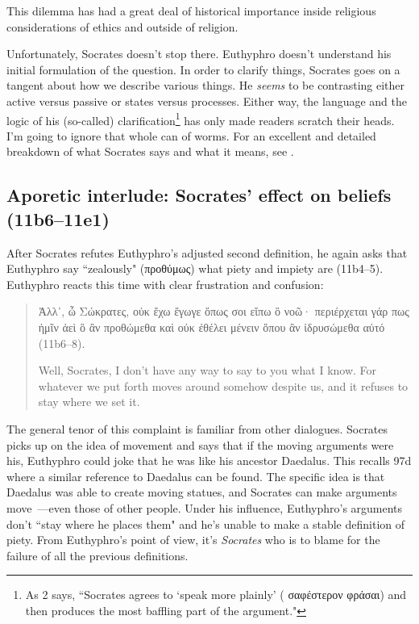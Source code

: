 \documentclass[12pt]{article}
\begin{document}
This dilemma has had a great deal of historical importance inside religious
considerations of ethics and outside of religion.

Unfortunately, Socrates doesn't stop there.  Euthyphro doesn't understand his
initial formulation of the question.  In order to clarify things, Socrates goes
on a tangent about how we describe various things.  He \emph{seems} to be
contrasting either active versus passive or states versus processes.  Either
way, the language and the logic of his (so-called) clarification\footnote{As
\cite{cohen1971} 2 says, ``Socrates agrees to `speak more plainly' ({\g
σαφέστερον φράσαι}) and then produces the most baffling part of the argument."}
has only made readers scratch their heads.  I'm going to ignore that whole can
of worms.  For an excellent and detailed breakdown of what Socrates says and
what it means, see \citet{cohen1971}.


\subsection{Aporetic interlude: Socrates' effect on beliefs (11b6--11e1)}

After Socrates refutes Euthyphro's adjusted second definition, he again asks
that Euthyphro say ``zealously" (προθύμως) what piety and impiety are
(11b4--5).  Euthyphro reacts this time with clear frustration and confusion:

\begin{quote}

    {\g Ἀλλ᾽, ὦ Σώκρατες, οὐκ ἔχω ἔγωγε ὅπως σοι εἴπω ὃ νοῶ· περιέρχεται γάρ
    πως ἡμῖν ἀεὶ ὃ ἂν προθώμεθα καὶ οὐκ ἐθέλει μένειν ὅπου ἂν ἱδρυσώμεθα αὐτό}
    (11b6--8).

    Well, Socrates, I don't have any way to say to you what I know. For
    whatever we put forth moves around somehow despite us, and it refuses to
    stay where we set it.

\end{quote}

The general tenor of this complaint is familiar from other dialogues.  Socrates
picks up on the idea of movement and says that if the moving arguments were
his, Euthyphro could joke that he was like his ancestor Daedalus.  This recalls
 97d where a similar reference to Daedalus can be found.  The
specific idea is that Daedalus was able to create moving statues, and Socrates
can make arguments move~---even those of other people.  Under his influence,
Euthyphro's arguments don't ``stay where he places them" and he's unable to
make a stable definition of piety.  From Euthyphro's point of view, it's
\emph{Socrates} who is to blame for the failure of all the previous
definitions.
\end{document}
